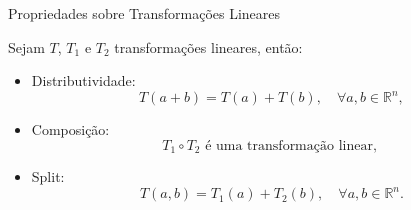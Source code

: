 
\begin{frame}{Propriedades sobre Transformações Lineares}

  Sejam $T$, $T_1$ e $T_2$ transformações lineares, então:

  \vspace{0.3cm}

  \begin{itemize}
    \item Distributividade:
      \[
        T(a + b) = T(a) + T(b), \quad \forall a, b \in \mathbb{R}^{n},
      \]

    \item Composição:
      \[
        T_1 \circ T_2 \text{ é uma transformação linear, }
      \]

    \item Split:
      \[
        T(a, b) = T_1(a) + T_2(b), \quad \forall a, b \in \mathbb{R}^{n}.
      \]
  \end{itemize}

\end{frame}